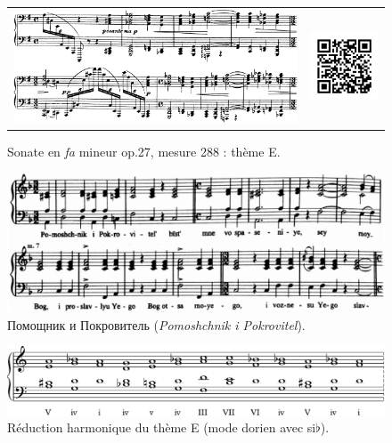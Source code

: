 \begin{figure}[!p]
  \begin{bigcenter}
    \begin{tabular}{lr}
      \includegraphics[width=12.5cm, keepaspectratio]{sonate-theme-E.png}
      &
      \includegraphics[width=3cm, keepaspectratio]{op1-qr.png}
    \end{tabular}
  \end{bigcenter}
  \caption{\label{sonate-theme-5}Sonate en \emph{fa} mineur op.27, mesure 288 : thème E.}
\end{figure}

\begin{figure}[!p]
  \begin{bigcenter}
    \includegraphics[width=15cm, keepaspectratio]{bortnyansky.png}
  \end{bigcenter}
  \caption{\label{bortnyansky}\foreignlanguage{russian}{Помощник и Покровитель} (\emph{Pomoshchnik i Pokrovitel}).}
\end{figure}

\begin{figure}[!p]
  \begin{bigcenter}
    \includegraphics[width=15cm, keepaspectratio]{religioso.pdf}
  \end{bigcenter}
  \caption{\label{sonate-theme-5-réduction}Réduction harmonique du thème E (mode dorien avec si$\flat$).}
\end{figure}

